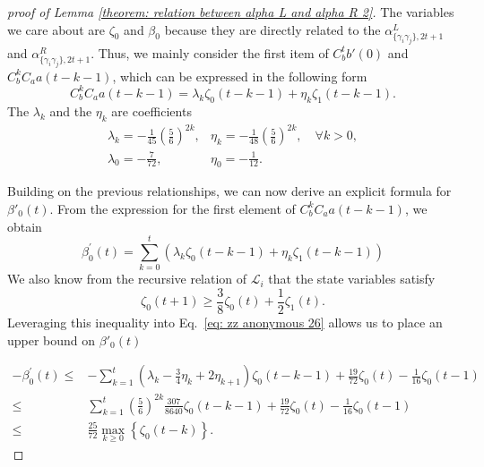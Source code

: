 \documentclass[journal=jctcce,a4paper,manuscript=article]{achemso}
\newcommand{\alpl}{\alpha_{\{\gamma_i\gamma_j\}, 2t+1}^{L}}
\newcommand{\alpr}{\alpha_{\{\gamma_i\gamma_j\}, 2t+1}^{R}}
\begin{document}
\begin{proof}[proof of Lemma \ref{theorem: relation between alpha L and alpha R 2}]
  The variables we care about are $\zeta_0$ and $\beta_0$ because they are
  directly related to the $\alpl$ and $\alpr$. Thus, we mainly consider the first
  item of $C_b^t b'(0)$ and $C_b^kC_aa(t-k-1)$, which can be expressed in the
  following form
  \begin{equation}
    C_b^kC_aa(t-k-1) = \lambda_k \zeta_0(t-k-1)+\eta_k \zeta_1(t-k-1).
  \end{equation}
  The $\lambda_k$ and the $\eta_k$ are coefficients
  \begin{equation}
    \begin{array}{ll}
      \lambda_k=-\frac{1}{45}\left(\frac{5}{6}\right)^{2 k}, & \eta_k=-\frac{1}{48}\left(\frac{5}{6}\right)^{2 k}, \quad \forall k>0, \\
      \lambda_0=-\frac{7}{72},                               & \eta_0=-\frac{1}{12}.
    \end{array}
  \end{equation}

  Building on the previous relationships, we can now derive an explicit formula
  for $\beta'_0(t)$. From the expression for the first element of
  $C_b^kC_aa(t-k-1)$, we obtain
  \begin{equation}
    \beta_0^{\prime}(t)=\sum_{k=0}^t\left(\lambda_k \zeta_0(t-k-1)+\eta_k \zeta_1(t-k-1)\right)
    \label{eq: zz anonymous 26}
  \end{equation}
  We also know from the recursive relation of $\mathcal{L}_i$ that the state variables satisfy
  \begin{equation}
    \zeta_0(t+1) \geq \frac{3}{8} \zeta_0(t)+\frac{1}{2} \zeta_1(t).
  \end{equation}
  Leveraging this inequality into Eq.~\ref{eq: zz anonymous 26} allows us to place an upper bound on $\beta'_0(t)$

  \begin{align}
    -\beta_0^{\prime}(t) \leq & -\sum_{k=1}^t\left(\lambda_k-\frac{3}{4} \eta_k+2 \eta_{k+1}\right) \zeta_0(t-k-1)+ \frac{19}{72} \zeta_0(t) - \frac{1}{16}\zeta_0(t-1) \\
    \leq                      & \sum_{k=1}^t\left(\frac{5}{6}\right)^{2 k} \frac{307}{8640} \zeta_0(t-k-1)+ \frac{19}{72} \zeta_0(t) - \frac{1}{16}\zeta_0(t-1)         \\
    \leq                      & \frac{25}{72} \max_{k \geq 0}\left\{\zeta_0(t-k)\right\}.
  \end{align}

\end{proof}
\end{document}
